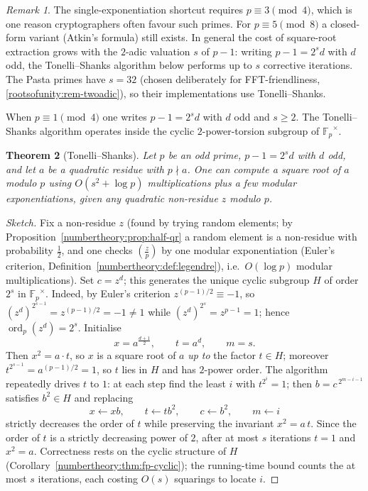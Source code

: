 \documentclass[11pt,a4paper]{article}
\newtheorem{theorem}{Theorem}[section]
\theoremstyle{definition}
\theoremstyle{remark}
\newtheorem{remark}[theorem]{Remark}
\newcommand{\Fp}{\ensuremath{\mathbb{F}_{p}}}
\DeclareMathOperator{\ord}{ord}
\newcommand{\legendre}[2]{\left(\frac{#1}{#2}\right)}
\begin{document}
\begin{remark}\label{numbertheory:rem:pasta-3mod4}
The single-exponentiation shortcut requires \(p \equiv 3 \pmod 4\), which is one reason cryptographers often favour such primes. For \(p \equiv 5 \pmod 8\) a closed-form variant (Atkin's formula) still exists. In general the cost of square-root extraction grows with the \(2\)-adic valuation \(s\) of \(p - 1\): writing \(p - 1 = 2^s d\) with \(d\) odd, the Tonelli--Shanks algorithm below performs up to \(s\) corrective iterations. The Pasta primes have \(s = 32\) (chosen deliberately for FFT-friendliness, \cref{rootsofunity:rem-twoadic}), so their implementations use Tonelli--Shanks.
\end{remark}

When \(p \equiv 1 \pmod 4\) one writes \(p - 1 = 2^s d\) with \(d\) odd and \(s \ge 2\). The Tonelli--Shanks algorithm operates inside the cyclic \(2\)-power-torsion subgroup of \(\Fp^\times\).

\begin{theorem}[Tonelli--Shanks]\label{numbertheory:thm:tonelli-shanks}
Let \(p\) be an odd prime, \(p-1 = 2^s d\) with \(d\) odd, and let \(a\) be a quadratic residue with \(p \nmid a\). One can compute a square root of \(a\) modulo \(p\) using \(O(s^2 + \log p)\) multiplications plus a few modular exponentiations, given any quadratic non-residue \(z\) modulo \(p\).
\end{theorem}

\begin{proof}[Sketch]
Fix a non-residue \(z\) (found by trying random elements; by Proposition~\ref{numbertheory:prop:half-qr} a random element is a non-residue with probability \(\tfrac12\), and one checks \(\legendre{z}{p}\) by one modular exponentiation (Euler's criterion, Definition~\ref{numbertheory:def:legendre}), i.e.\ \(O(\log p)\) modular multiplications). Set \(c = z^{d}\); this generates the unique cyclic subgroup \(H\) of order \(2^s\) in \(\Fp^\times\). Indeed, by Euler's criterion \(z^{(p-1)/2} \equiv -1\), so \((z^d)^{2^{s-1}} = z^{(p-1)/2} = -1 \neq 1\) while \((z^d)^{2^s} = z^{p-1} = 1\); hence \(\ord_p(z^d) = 2^s\). Initialise
\[
x = a^{\frac{d+1}{2}}, \qquad t = a^{d}, \qquad m = s.
\]
Then \(x^2 = a\cdot t\), so \(x\) is a square root of \(a\) \emph{up to} the factor \(t \in H\); moreover \(t^{2^{s-1}}=a^{(p-1)/2}=1\), so \(t\) lies in \(H\) and has \(2\)-power order. The algorithm repeatedly drives \(t\) to \(1\): at each step find the least \(i\) with \(t^{2^{i}} = 1\); then \(b = c^{\,2^{m-i-1}}\) satisfies \(b^2 \in H\) and replacing
\[
x \leftarrow x b, \qquad t \leftarrow t b^2, \qquad c \leftarrow b^2, \qquad m \leftarrow i
\]
strictly decreases the order of \(t\) while preserving the invariant \(x^2 = a\,t\). Since the order of \(t\) is a strictly decreasing power of \(2\), after at most \(s\) iterations \(t = 1\) and \(x^2 = a\). Correctness rests on the cyclic structure of \(H\) (Corollary~\ref{numbertheory:thm:fp-cyclic}); the running-time bound counts the at most \(s\) iterations, each costing \(O(s)\) squarings to locate \(i\).
\end{proof}
\end{document}
